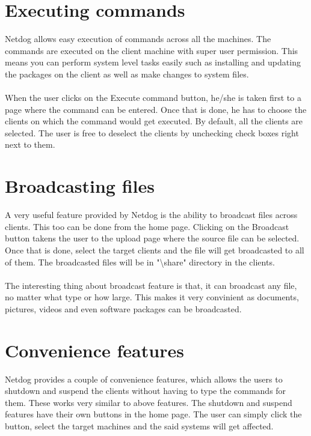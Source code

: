 \section{Executing commands}

Netdog allows easy execution of commands across all the machines. The commands
are executed on the client machine with super user permission. This means you
can perform system level tasks easily such as installing and updating the
packages on the client as well as make changes to system files.
\\\\
When the user clicks on the Execute command button, he/she is taken first to a
page where the command can be entered. Once that is done, he has to choose the
clients on which the command would get executed. By default, all the clients
are selected. The user is free to deselect the clients by unchecking check
boxes right next to them.

\section{Broadcasting files}

A very useful feature provided by Netdog is the ability to broadcast files
across clients. This too can be done from the home page. Clicking on the
Broadcast button takens the user to the upload page where the source file can
be selected. Once that is done, select the target clients and the file will get
broadcasted to all of them. The broadcasted files will be in
"\textbackslash share" directory in the clients.
\\\\
The interesting thing about broadcast feature is that, it can broadcast any
file, no matter what type or how large. This makes it very convinient as
documents, pictures, videos and even software packages can be broadcasted.

\section{Convenience features}

Netdog provides a couple of convenience features, which allows the users to
shutdown and suspend the clients without having to type the commands for them.
These works very similar to above features. The shutdown and suspend features
have their own buttons in the home page. The user can simply click the button,
select the target machines and the said systems will get affected.

